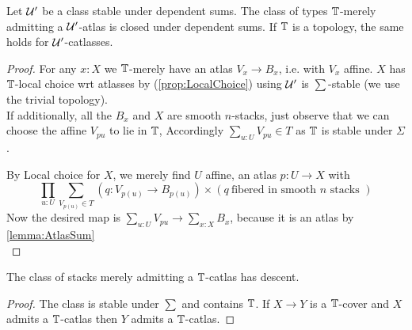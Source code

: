 \begin{theorem}{\label{thm:atlasStableSum}}
	Let $\mathcal{U}'$ be a class stable under dependent sums.
	The class of types $\mathbb{T}$-merely admitting a $\mathcal{U}'$-atlas is closed under dependent sums. If $\mathbb{T}$ is a topology, the same holds for $\mathcal{U}'$-catlasses.
\end{theorem}
\begin{proof}
	For any $x : X$ we $\mathbb{T}$-merely have an atlas $V_x \to B_x$, i.e. with $V_x$ affine. %
	$X$ has $\mathbb{T}$-local choice wrt atlasses by (\ref{prop:LocalChoice}) using $\mathcal{U}'$ is $\sum$-stable (we use the trivial topology).\\
	If additionally, all the $B_x$ and $X$ are smooth $n$-stacks, just observe that we can choose the affine $V_{p u}$ to lie in $\mathbb{T}$, Accordingly $\sum_{u : U} V_{p u} \in T$ as $\mathbb{T}$ is stable under $\Sigma$.

	By Local choice for $X$, we merely find $U$ affine, an atlas $p : U \to X$ %
	with
	\[
	\prod_{u : U} \sum_{V_{p(u)} \in T} (q : V_{p(u)} \to B_{p(u)}) \times (q \ \text{fibered in smooth } n \text{ stacks } )
	\]
	Now the desired map is $\sum_{u : U} V_{p u} \to \sum_{x : X} B_x$, because it is  an atlas %
	by \ref{lemma:AtlasSum} \\
\end{proof}
%
\begin{corollary}{\label{cor:DescentCatlas}}
	The class of stacks merely admitting a $\mathbb{T}$-catlas has descent.
\end{corollary}
\begin{proof}
	The class is stable under $\sum$ and contains $\mathbb{T}$.
	If $X \to Y$ is a $\mathbb{T}$-cover and $X$ admits a $\mathbb{T}$-catlas then $Y$ admits a $\mathbb{T}$-catlas. %
\end{proof}